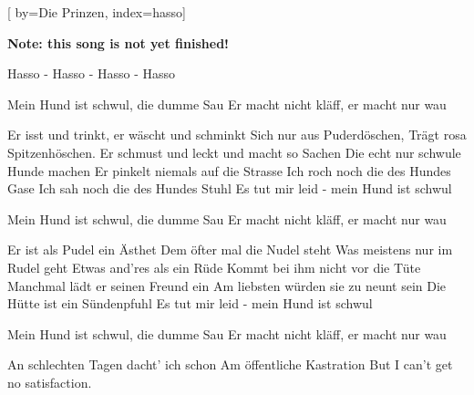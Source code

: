 
[%
    by={Die Prinzen},
    index={hasso}]


    \label{hasso}

    \textbf{Note: this song is not yet finished!}

    \beginverse*
        Hasso - Hasso - Hasso - Hasso
    \endverse

    \beginchorus\memorize[chorus]
        Mein Hund ist schwul, die dumme Sau
        Er macht nicht kläff, er macht nur wau
    \endchorus

    \beginverse\memorize[verse]
        Er isst und trinkt, er wäscht und schminkt
        Sich nur aus Puderdöschen,
        Trägt rosa Spitzenhöschen.
        Er schmust und leckt und macht so Sachen
        Die echt nur schwule Hunde machen
        Er pinkelt niemals auf die Strasse
        Ich roch noch die des Hundes Gase
        Ich sah noch die des Hundes Stuhl
        Es tut mir leid - mein Hund ist schwul
    \endverse

    \beginchorus\replay[chorus]
        Mein Hund ist schwul, die dumme Sau
        Er macht nicht kläff, er macht nur wau
    \endchorus

    \beginverse\replay[verse]
        Er ist als Pudel ein Ästhet
        Dem öfter mal die Nudel steht
        Was meistens nur im Rudel geht
        Etwas and'res als ein Rüde
        Kommt bei ihm nicht vor die Tüte
        Manchmal lädt er seinen Freund ein
        Am liebsten würden sie zu neunt sein
        Die Hütte ist ein Sündenpfuhl
        Es tut mir leid - mein Hund ist schwul
    \endverse

    \beginchorus\replay[chorus]
        Mein Hund ist schwul, die dumme Sau
        Er macht nicht kläff, er macht nur wau
    \endchorus

    \beginverse\replay[verse]
        An schlechten Tagen dacht' ich schon
        Am öffentliche Kastration
        But I can't get no satisfaction.
    \endverse
\endsong
